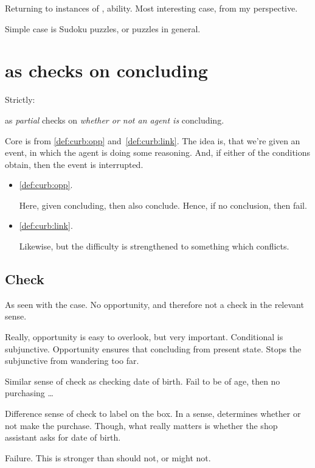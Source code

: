 \begin{note}
  Returning to instances of , ability.
  Most interesting case, from my perspective.

  Simple case is Sudoku puzzles, or puzzles in general.
\end{note}

\section{ as checks on concluding}
\label{cha:zS:sec:curbs:checks}

\begin{note}
  Strictly:

   as \emph{partial} checks on \emph{whether or not an agent is} concluding.

  Core is from \ref{def:curb:opp} and~\ref{def:curb:link}.
  The idea is, that we're given an event, in which the agent is doing some reasoning.
  And, if either of the conditions obtain, then the event is interrupted.

  \begin{itemize}
  \item
    \ref{def:curb:opp}.

    Here, given concluding, then also conclude.
    Hence, if no conclusion, then fail.

  \item
    \ref{def:curb:link}.

    Likewise, but the difficulty is strengthened to something which conflicts.
  \end{itemize}
\end{note}

\subsection{Check}

\begin{note}
  As seen with the \citeauthor{Dretske:1970to} case.
  No opportunity, and therefore not a check in the relevant sense.

  Really, opportunity is easy to overlook, but very important.
  Conditional is subjunctive.
  Opportunity ensures that concluding from present state.
  Stops the subjunctive from wandering too far.

  Similar sense of check as checking date of birth.
  Fail to be of age, then no purchasing \dots

  Difference sense of check to label on the box.
  In a sense, determines whether or not make the purchase.
  Though, what really matters is whether the shop assistant asks for date of birth.

  Failure.
  This is stronger than should not, or might not.
\end{note}

